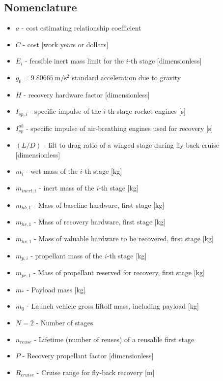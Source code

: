 \documentclass{iaf-iac}
\begin{document}
\begin{multicols}{2}

\section*{Nomenclature}
\begin{itemize}
    \item $a$ - cost estimating relationship coefficient
    \item $C$ - cost [work years or dollars]
    \item $E_i$ - feasible inert mass limit for the $i$-th stage [dimensionless]
    \item $g_0 = \SI{9.80665}{\meter\per\second\squared}$ standard acceleration due to gravity
    \item $H$ - recovery hardware factor [dimensionless]
    \item $I_{sp,i}$ - specific impulse of the $i$-th stage rocket engines [\si{\second}]
    \item $I_{sp}^{ab}$ - specific impulse of air-breathing engines used for recovery [\si{\second}]
    \item $(L/D)$ - lift to drag ratio of a winged stage during fly-back cruise [dimensionless]
    \item $m_i$ - wet mass of the $i$-th stage [\si{kg}]
    \item $m_{inert,i}$ - inert mass of the $i$-th stage [\si{kg}]
    \item $m_{hb,1}$ - Mass of baseline hardware, first stage [\si{kg}]
    \item $m_{hr,1}$ - Mass of recovery hardware, first stage [\si{kg}]
    \item $m_{hv,1}$ - Mass of valuable hardware to be recovered, first stage [\si{kg}]
    \item $m_{p,i}$ - propellant mass of the $i$-th stage [\si{kg}]
    \item $m_{pr,1}$ - Mass of propellant reserved for recovery, first stage [\si{kg}]
    \item $m_*$ - Payload mass [\si{kg}]
    \item $m_0$ - Launch vehicle gross liftoff mass, including payload [\si{kg}]
    \item $N = 2$ - Number of stages
    \item $n_{reuse}$ - Lifetime (number of reuses) of a reusable first stage
    \item $P$ - Recovery propellant factor [dimensionless]
    \item $R_{cruise}$ - Cruise range for fly-back recovery [\si{\meter}]

\end{itemize}
\end{multicols}
\end{document}
